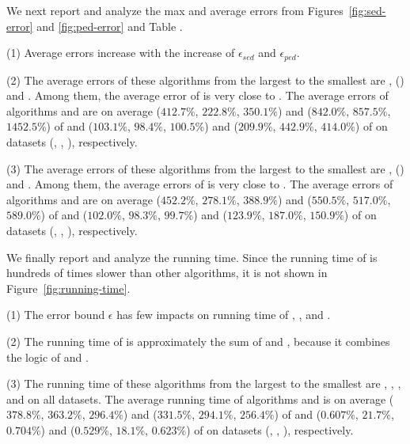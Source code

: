 {%




 We next report and analyze the max and average errors from Figures~\ref{fig:sed-error} and \ref{fig:ped-error} and Table .

\ni (1) Average errors increase with the increase of $\epsilon_{sed}$ and $\epsilon_{ped}$.

\ni (2) The average \sed errors of these algorithms from the largest to the smallest are \sitt, \grts (\citt) and \ldrh. Among them, the average \sed error of \citt is very close to \grts.
The average \sed errors of algorithms \citt and \sitt are on average
($412.7\%$, $222.8\%$, $350.1\%$)
and ($842.0\%$, $857.5\%$, $1452.5\%$)
of \ldrh and ($103.1\%$, $98.4\%$, $100.5\%$) and
($209.9\%$, $442.9\%$, $414.0\%$)
of \grts on datasets (\mopsi, \sercar, \geolife), respectively.

\ni (3) The average \ped errors of these algorithms from the largest to the smallest are \sitt, \grts (\citt) and \ldrh. Among them, the average \ped errors of \citt is very close to \grts.
The average \ped errors of algorithms \citt and \sitt are on average
($452.2\%$, $278.1\%$, $388.9\%$)
and ($550.5\%$, $517.0\%$, $589.0\%$)
of \ldrh and ($102.0\%$, $98.3\%$, $99.7\%$) and
($123.9\%$, $187.0\%$, $150.9\%$)
of \grts on datasets (\mopsi, \sercar, \geolife), respectively.




 We finally report and analyze the running time.
Since the running time of \grts is hundreds of times slower than other algorithms, it is not shown in Figure~\ref{fig:running-time}.

\ni (1) The error bound $\epsilon$ has few impacts on running time of \citt, \sitt, \bitt and \ldrh.

\ni (2) The running time of \bitt is approximately the sum of \citt and \sitt, because it combines the logic of \citt and \sitt.

\ni (3) The running time of these algorithms from the largest to the smallest are \grts, \bitt, \citt, \sitt and \ldrh on all datasets.
The average running time of algorithms \citt and \sitt is on average
($378.8\%$, $363.2\%$, $296.4\%$)
and ($331.5\%$, $294.1\%$, $256.4\%$)
of \ldrh and ($0.607\%$, $21.7\%$, $0.704\%$) and
($0.529\%$, $18.1\%$, $0.623\%$)
of \grts on datasets (\mopsi, \sercar, \geolife), respectively.



}

